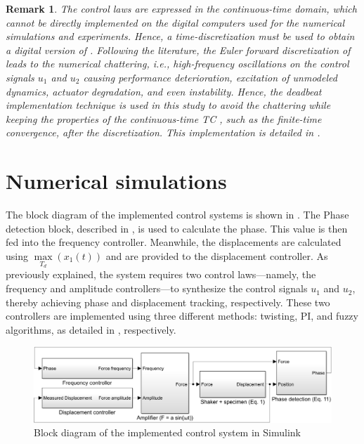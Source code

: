 \documentclass[lettersize,journal]{IEEEtran}
\newtheorem{remark}{Remark}
\begin{document}
\begin{remark} \label{R_chattering}
    The control laws  are expressed in the continuous-time domain, which cannot be directly implemented on the digital computers used for the numerical simulations and experiments. Hence, a time-discretization must be used to obtain a digital version of . Following the literature, the Euler forward discretization of  leads to the numerical chattering, {\em i.e.}, high-frequency oscillations on the control signals $u_1$ and $u_2$ causing performance deterioration, excitation of unmodeled dynamics, actuator degradation, and even instability. Hence, the deadbeat implementation technique \cite{MOJALLIZADEH_Franklin} is used in this study to avoid the chattering while keeping the properties of the continuous-time TC , such as the finite-time convergence, after the discretization. This implementation is detailed in .
\end{remark}


\section{Numerical simulations} \label{S_simulations}

The block diagram of the implemented control systems is shown in . The {\selectfont Phase detection} block, described in , is used to calculate the phase. This value is then fed into the {\selectfont frequency controller}. Meanwhile, the displacements are calculated using $\max\limits_{T_d}(x_1(t))$ and are provided to the {\selectfont displacement controller}. As previously explained, the system requires two control laws—namely, the frequency and amplitude controllers—to synthesize the control signals $u_1$ and $u_2$, thereby achieving phase and displacement tracking, respectively. These two controllers are implemented using three different methods: twisting, PI, and fuzzy algorithms, as detailed in , respectively.



\begin{figure}
    \centering    \includegraphics[width=\linewidth]{F_simulink.png}
    \caption{Block diagram of the implemented control system in {\selectfont Simulink} }
    \label{F_diagram}
\end{figure}
\end{document}
